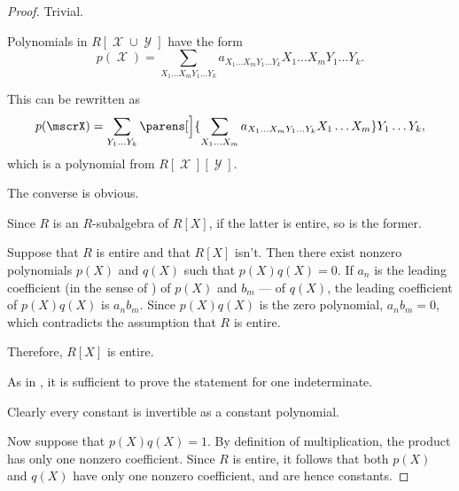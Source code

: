\begin{proof}
   Trivial.

   Polynomials in \( R[\mscrX \cup \mscrY] \) have the form
  \begin{equation*}
    p(\mscrX) = \sum_{X_1 \ldots X_m Y_1 \ldots Y_k} a_{X_1 \ldots X_m Y_1 \ldots Y_k} X_1 \ldots X_m Y_1 \ldots Y_k.
  \end{equation*}

  This can be rewritten as
  \begin{equation*}
    p(\mscrX) = \sum_{Y_1 \ldots Y_k} \parens[\Big]{ \sum_{X_1 \ldots X_m} a_{X_1 \ldots X_m Y_1 \ldots Y_k} X_1 \ldots X_m } Y_1 \ldots Y_k,
  \end{equation*}
  which is a polynomial from \( R[\mscrX][\mscrY] \).

  The converse is obvious.


  \SufficiencySubProof Since \( R \) is an \( R \)-subalgebra of \( R[X] \), if the latter is entire, so is the former.

  \NecessitySubProof Suppose that \( R \) is entire and that \( R[X] \) isn't. Then there exist nonzero polynomials \( p(X) \) and \( q(X) \) such that \( p(X) q(X) = 0 \). If \( a_n \) is the leading coefficient (in the sense of ) of \( p(X) \) and \( b_m \) --- of \( q(X) \), the leading coefficient of \( p(X) q(X) \) is \( a_n b_m \). Since \( p(X) q(X) \) is the zero polynomial, \( a_n b_m = 0 \), which contradicts the assumption that \( R \) is entire.

  Therefore, \( R[X] \) is entire.

   As in , it is sufficient to prove the statement for one indeterminate.

  Clearly every constant is invertible as a constant polynomial.

  Now suppose that \( p(X) q(X) = 1 \). By definition of multiplication, the product has only one nonzero coefficient. Since \( R \) is entire, it follows that both \( p(X) \) and \( q(X) \) have only one nonzero coefficient, and are hence constants.
\end{proof}

